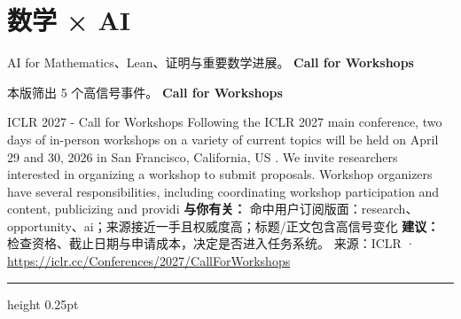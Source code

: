 \documentclass[10.5pt]{ctexart}
\begin{document}
\section*{数学 × AI}
{\color{ormuted} AI for Mathematics、Lean、证明与重要数学进展。}
\vspace{2mm}
{\LARGE\bfseries Call for Workshops}\par
\vspace{1mm}
{\color{ormuted} 本版筛出 5 个高信号事件。}
\vspace{3mm}
{\Large\bfseries Call for Workshops}\par
ICLR 2027 - Call for Workshops Following the ICLR 2027 main conference, two days of in-person workshops on a variety of current topics will be held on April 29 and 30, 2026 in San Francisco, California, US . We invite researchers interested in organizing a workshop to submit proposals. Workshop organizers have several responsibilities, including coordinating workshop participation and content, publicizing and providi
\textbf{与你有关：} 命中用户订阅版面：research、opportunity、ai；来源接近一手且权威度高；标题/正文包含高信号变化
\textbf{建议：} 检查资格、截止日期与申请成本，决定是否进入任务系统。
{\footnotesize\color{ormuted} 来源：ICLR · \url{https://iclr.cc/Conferences/2027/CallForWorkshops}}
\vspace{4mm}
\hrule height 0.25pt
\vspace{3mm}
\end{document}

